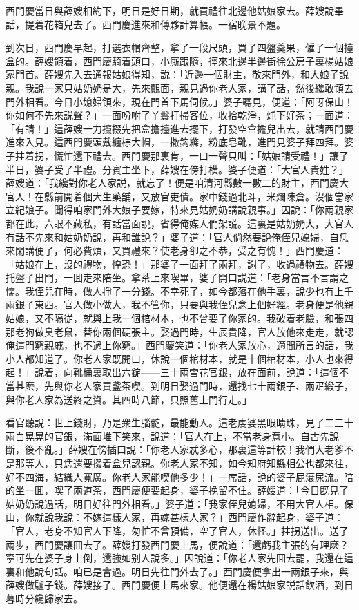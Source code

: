 西門慶當日與薛嫂相約下，明日是好日期，就買禮往北邊他姑娘家去。薛嫂說畢話，提着花箱兒去了。西門慶進來和傅夥計算帳。一宿晚景不題。

到次日，西門慶早起，打選衣帽齊整，拿了一段尺頭，買了四盤羹果，僱了一個擡盒的。薛嫂領着，西門慶騎着頭口，小廝跟隨，徑來北邊半邊街徐公房子裏楊姑娘家門首。薛嫂先入去通報姑娘得知，説：「近邊一個財主，敬來門外，和大娘子說親。我說一家只姑奶奶是大，先來覿面，親見過你老人家，講了話，然後纔敢領去門外相看。今日小媳婦領來，現在門首下馬伺候。」婆子聽見，便道：「阿呀保山！你如何不先來説聲？」一面吩咐了丫鬟打掃客位，收拾乾淨，炖下好茶；一面道：「有請！」這薛嫂一力攛掇先把盒擔擡進去擺下，打發空盒擔兒出去，就請西門慶進來入見。這西門慶頭戴纏棕大帽，一撒鈎縧，粉底皂靴，進門見婆子拜四拜。婆子拄着拐，慌忙還下禮去。西門慶那裏肯，一口一聲只叫：「姑娘請受禮！」讓了半日，婆子受了半禮。分賓主坐下，薛嫂在傍打横。婆子便道：「大官人貴姓？」薛嫂道：「我纔對你老人家説，就忘了！便是咱清河縣數一數二的財主，西門慶大官人！在縣前開着個大生藥舖，又放官吏債。家中錢過北斗，米爛陳倉。沒個當家立紀娘子。聞得咱家門外大娘子要嫁，特來見姑奶奶講說親事。」因說：「你兩親家都在此，六眼不藏私，有話當面說，省得俺媒人們架謊。這裏是姑奶奶大，大官人有話不先來和姑奶奶說，再和誰說？」婆子道：「官人倘然要說俺侄兒媳婦，自恁來閑講便了，何必費煩，又買禮來？使老身卻之不恭，受之有愧！」西門慶道：「姑娘在上，沒的禮物，惶恐！」那婆子一面拜了兩拜，謝了，收過禮物去。薛嫂托盤子出門，一囬走來陪坐。拿茶上來喫畢，婆子開口説道：「老身當言不言謂之懦。我侄兒在時，做人掙了一分錢。不幸死了，如今都落在他手裏，說少也有上千兩銀子東西。官人做小做大，我不管你，只要與我侄兒念上個好經。老身便是他親姑娘，又不隔従，就與上我一個棺材本，也不曾要了你家的。我破着老臉，和張四那老狗做臭老鼠，替你兩個硬張主。娶過門時，生辰貴降，官人放他來走走，就認俺這門窮親戚，也不過上你窮。」西門慶笑道：「你老人家放心，適間所言的話，我小人都知道了。你老人家既開口，休說一個棺材本，就是十個棺材本，小人也來得起！」說着，向靴桶裏取出六錠——三十兩雪花官銀，放在面前，說道：「這個不當甚麽，先與你老人家買盞茶喫。到明日娶過門時，還找七十兩銀子、兩疋緞子，與你老人家為送終之資。其四時八節，只照舊上門行走。」

看官聽說：世上錢財，乃是衆生腦髄，最能動人。這老虔婆黑眼睛珠，見了二三十兩白晃晃的官銀，滿面堆下笑來，說道：「官人在上，不當老身意小。自古先說斷，後不亂。」薛嫂在傍插口說：「你老人家忒多心，那裏這等計較！我們大老爹不是那等人，只恁還要掇着盒兒認親。你老人家不知，如今知府知縣相公也都來往，好不四海，結織人寬廣。你老人家能喫他多少！」一席話，說的婆子屁滾尿流。陪的坐一囬，喫了兩道茶，西門慶便要起身，婆子挽留不住。薛嫂道：「今日旣見了姑奶奶說過話，明日好往門外相看。」婆子道：「我家侄兒媳婦，不用大官人相。保山，你就說我說：不嫁這樣人家，再嫁甚樣人家？」西門慶作辭起身，婆子道：「官人，老身不知官人下降，匆忙不曾預備，空了官人，休怪。」拄拐送出。送了兩步，西門慶讓囬去了。薛嫂打發西門慶上馬，便說道：「還虧我主張的有理麽？寜可先在婆子身上倒，還強如别人說多。」因說道：「你老人家先囬去罷，我還在這裏和他說句話。咱已是會過。明日先往門外去了。」西門慶便拿出一兩銀子來，與薛嫂做驢子錢。薛嫂接了。西門慶便上馬來家。他便還在楊姑娘家説話飲酒，到日暮時分纔歸家去。

